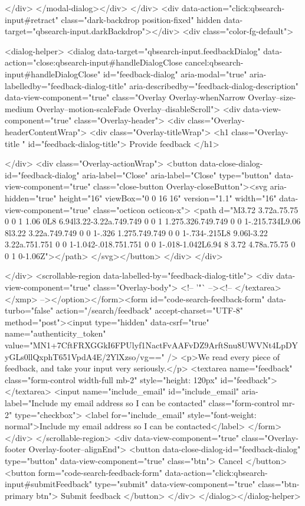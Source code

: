     </div>
</modal-dialog></div>
  </div>
  <div data-action="click:qbsearch-input#retract" class="dark-backdrop position-fixed" hidden data-target="qbsearch-input.darkBackdrop"></div>
  <div class="color-fg-default">
    
<dialog-helper>
  <dialog data-target="qbsearch-input.feedbackDialog" data-action="close:qbsearch-input#handleDialogClose cancel:qbsearch-input#handleDialogClose" id="feedback-dialog" aria-modal="true" aria-labelledby="feedback-dialog-title" aria-describedby="feedback-dialog-description" data-view-component="true" class="Overlay Overlay-whenNarrow Overlay--size-medium Overlay--motion-scaleFade Overlay--disableScroll">
    <div data-view-component="true" class="Overlay-header">
  <div class="Overlay-headerContentWrap">
    <div class="Overlay-titleWrap">
      <h1 class="Overlay-title " id="feedback-dialog-title">
        Provide feedback
      </h1>
        
    </div>
    <div class="Overlay-actionWrap">
      <button data-close-dialog-id="feedback-dialog" aria-label="Close" aria-label="Close" type="button" data-view-component="true" class="close-button Overlay-closeButton"><svg aria-hidden="true" height="16" viewBox="0 0 16 16" version="1.1" width="16" data-view-component="true" class="octicon octicon-x">
    <path d="M3.72 3.72a.75.75 0 0 1 1.06 0L8 6.94l3.22-3.22a.749.749 0 0 1 1.275.326.749.749 0 0 1-.215.734L9.06 8l3.22 3.22a.749.749 0 0 1-.326 1.275.749.749 0 0 1-.734-.215L8 9.06l-3.22 3.22a.751.751 0 0 1-1.042-.018.751.751 0 0 1-.018-1.042L6.94 8 3.72 4.78a.75.75 0 0 1 0-1.06Z"></path>
</svg></button>
    </div>
  </div>
  
</div>
      <scrollable-region data-labelled-by="feedback-dialog-title">
        <div data-view-component="true" class="Overlay-body">        <!-- '"` --><!-- </textarea></xmp> --></option></form><form id="code-search-feedback-form" data-turbo="false" action="/search/feedback" accept-charset="UTF-8" method="post"><input type="hidden" data-csrf="true" name="authenticity_token" value="MN1+7CftFRXGGkI6FPUlyf1NactFvAAFvDZ9ArftSnu8UWVNt4LpDYyGLs0llQxphT651VpdA4E/2YlXzso/vg==" />
          <p>We read every piece of feedback, and take your input very seriously.</p>
          <textarea name="feedback" class="form-control width-full mb-2" style="height: 120px" id="feedback"></textarea>
          <input name="include_email" id="include_email" aria-label="Include my email address so I can be contacted" class="form-control mr-2" type="checkbox">
          <label for="include_email" style="font-weight: normal">Include my email address so I can be contacted</label>
</form></div>
      </scrollable-region>
      <div data-view-component="true" class="Overlay-footer Overlay-footer--alignEnd">          <button data-close-dialog-id="feedback-dialog" type="button" data-view-component="true" class="btn">    Cancel
</button>
          <button form="code-search-feedback-form" data-action="click:qbsearch-input#submitFeedback" type="submit" data-view-component="true" class="btn-primary btn">    Submit feedback
</button>
</div>
</dialog></dialog-helper>

